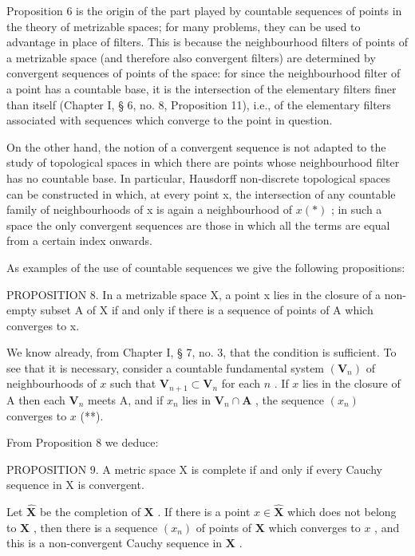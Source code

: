 Proposition 6 is the origin of the part played by countable sequences of points in the theory of metrizable spaces; for many problems, they can be used to advantage in place of filters. This is because the neighbourhood filters of points of a metrizable space (and therefore also convergent filters) are determined by convergent sequences of points of the space: for since the neighbourhood filter of a point has a countable base, it is the intersection of the elementary filters finer than itself (Chapter I, § 6, no. 8, Proposition 11), i.e., of the elementary filters associated with sequences which converge to the point in question.

On the other hand, the notion of a convergent sequence is not adapted to the study of topological spaces in which there are points whose neighbourhood filter has no countable base. In particular, Hausdorff non-discrete topological spaces can be constructed in which, at every point x, the intersection of any countable family of neighbourhoods of x is again a neighbourhood of \(x (*)\) ; in such a space the only convergent sequences are those in which all the terms are equal from a certain index onwards.

As examples of the use of countable sequences we give the following propositions:

PROPOSITION 8. In a metrizable space X, a point x lies in the closure of a non-empty subset A of X if and only if there is a sequence of points of A which converges to x.

We know already, from Chapter I, § 7, no. 3, that the condition is sufficient. To see that it is necessary, consider a countable fundamental system \((\mathbf{V}_n)\) of neighbourhoods of \(x\) such that \(\mathbf{V}_{n+1} \subset \mathbf{V}_n\) for each \(n\) . If \(x\) lies in the closure of A then each \(\mathbf{V}_n\) meets A, and if \(x_n\) lies in \(\mathbf{V}_n \cap \mathbf{A}\) , the sequence \((x_n)\) converges to \(x\) (**).

From Proposition 8 we deduce:

PROPOSITION 9. A metric space X is complete if and only if every Cauchy sequence in X is convergent.

Let \(\hat{\mathbf{X}}\) be the completion of \(\mathbf{X}\) . If there is a point \(x \in \hat{\mathbf{X}}\) which does not belong to \(\mathbf{X}\) , then there is a sequence \((x_n)\) of points of \(\mathbf{X}\) which converges to \(x\) , and this is a non-convergent Cauchy sequence in \(\mathbf{X}\) .

